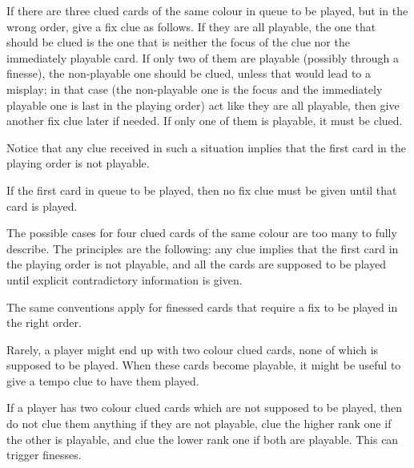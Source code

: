\begin{convention}
	If there are three clued cards of the same colour in queue to be played, but in the wrong order, give a fix clue as follows. If they are all playable, the one that should be clued is the one that is neither the focus of the clue nor the immediately playable card. If only two of them are playable (possibly through a finesse), the non-playable one should be clued, unless that would lead to a misplay; in that case (the non-playable one is the focus and the immediately playable one is last in the playing order) act like they are all playable, then give another fix clue later if needed. If only one of them is playable, it must be clued.
\end{convention}

Notice that any clue received in such a situation implies that the first card in the playing order is not playable.

\begin{corollary}
	If the first card in queue to be played, then no fix clue must be given until that card is played.
\end{corollary}

The possible cases for four clued cards of the same colour are too many to fully describe. The principles are the following: any clue implies that the first card in the playing order is not playable, and all the cards are supposed to be played until explicit contradictory information is given.

The same conventions apply for finessed cards that require a fix to be played in the right order.

Rarely, a player might end up with two colour clued cards, none of which is supposed to be played. When these cards become playable, it might be useful to give a tempo clue to have them played.

\begin{convention}
	If a player has two colour clued cards which are not supposed to be played, then do not clue them anything if they are not playable, clue the higher rank one if the other is playable, and clue the lower rank one if both are playable. This can trigger finesses.
\end{convention}